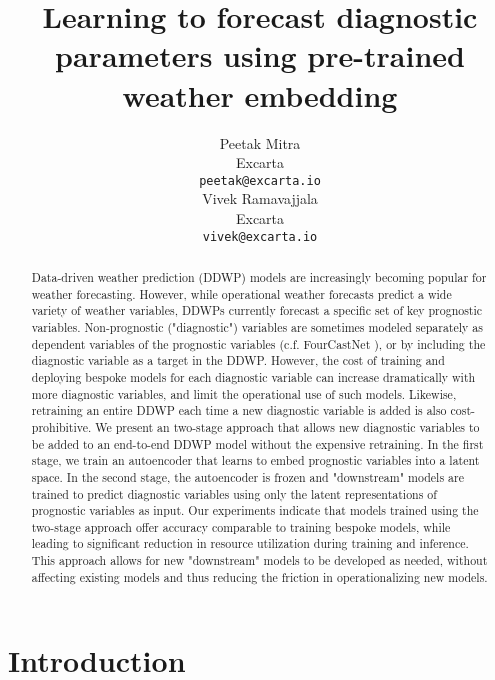 \documentclass{article}
\title{Learning to forecast diagnostic parameters using pre-trained weather embedding}
\author{%
  Peetak Mitra \\
  Excarta\\
  \texttt{peetak@excarta.io} \\
   \And
   Vivek Ramavajjala \\
   Excarta \\
   \texttt{vivek@excarta.io} \\
}
\begin{document}
\maketitle

\begin{abstract}

Data-driven weather prediction (DDWP) models are increasingly becoming popular for weather forecasting. However, while operational weather forecasts predict a wide variety of weather variables, DDWPs currently forecast a specific set of key prognostic variables. Non-prognostic ("diagnostic") variables are sometimes modeled separately as dependent variables of the prognostic variables (c.f. FourCastNet \cite{pathak2022fourcastnet}), or by including the diagnostic variable as a target in the DDWP. However, the cost of training and deploying bespoke models for each diagnostic variable can increase dramatically with more diagnostic variables, and limit the operational use of such models. Likewise, retraining an entire DDWP each time a new diagnostic variable is added is also cost-prohibitive. We present an two-stage approach that allows new diagnostic variables to be added to an end-to-end DDWP model without the expensive retraining. In the first stage, we train an autoencoder that learns to embed prognostic variables into a latent space. In the second stage, the autoencoder is frozen and "downstream" models are trained to predict diagnostic variables using only the latent representations of prognostic variables as input. Our experiments indicate that models trained using the two-stage approach offer accuracy comparable to training bespoke models, while leading to significant reduction in resource utilization during training and inference. This approach allows for new "downstream" models to be developed as needed, without affecting existing models and thus reducing the friction in operationalizing new models.

\end{abstract}

\section{Introduction}
\end{document}
